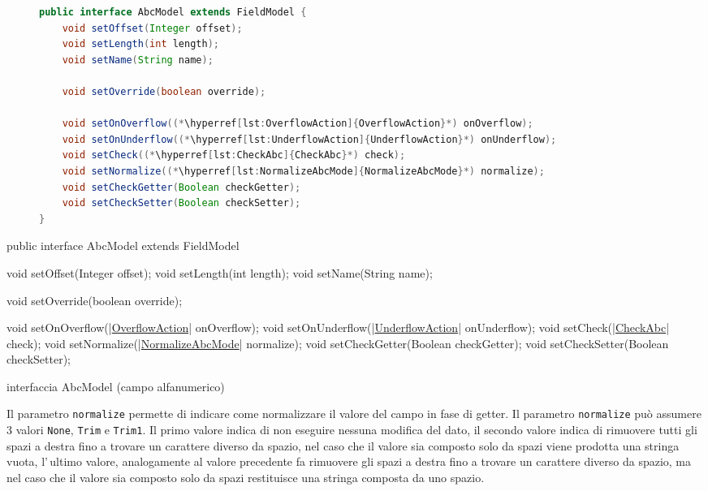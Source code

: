 \ifesource
\begin{figure*}[!htb]
\begin{lstlisting}[language=java, 
caption=interfaccia AbcModel (campo alfanumerico), 
label=lst:AbcModel]
public interface AbcModel extends FieldModel {
    void setOffset(Integer offset);
    void setLength(int length);
    void setName(String name);

    void setOverride(boolean override);

    void setOnOverflow((*\hyperref[lst:OverflowAction]{OverflowAction}*) onOverflow);
    void setOnUnderflow((*\hyperref[lst:UnderflowAction]{UnderflowAction}*) onUnderflow);
    void setCheck((*\hyperref[lst:CheckAbc]{CheckAbc}*) check);
    void setNormalize((*\hyperref[lst:NormalizeAbcMode]{NormalizeAbcMode}*) normalize);
    void setCheckGetter(Boolean checkGetter);
    void setCheckSetter(Boolean checkSetter);
}
\end{lstlisting}
\end{figure*}
\else
\begin{elisting}[!htb]
\begin{javacode}
public interface AbcModel extends FieldModel {
    void setOffset(Integer offset);
    void setLength(int length);
    void setName(String name);

    void setOverride(boolean override);

    void setOnOverflow(|\hyperref[lst:OverflowAction]{OverflowAction}| onOverflow);
    void setOnUnderflow(|\hyperref[lst:UnderflowAction]{UnderflowAction}| onUnderflow);
    void setCheck(|\hyperref[lst:CheckAbc]{CheckAbc}| check);
    void setNormalize(|\hyperref[lst:NormalizeAbcMode]{NormalizeAbcMode}| normalize);
    void setCheckGetter(Boolean checkGetter);
    void setCheckSetter(Boolean checkSetter);
}
\end{javacode}
\caption{interfaccia AbcModel (campo alfanumerico)}
\label{lst:AbcModel}
\end{elisting}
\fi

Il parametro \hypertarget{abc:nrm}{\texttt{normalize}} permette di indicare come 
normalizzare il valore del campo in fase di getter.
Il parametro \verb!normalize! può assumere 3 valori \verb!None!, \verb!Trim! e
\verb!Trim1!. Il primo valore indica di non eseguire nessuna modifica del dato,
il secondo valore indica di rimuovere tutti gli spazi a destra fino a trovare
un carattere diverso da spazio, nel caso che il valore sia composto solo da
spazi viene prodotta una stringa vuota, l'\,ultimo valore, analogamente al 
valore precedente fa rimuovere gli spazi a destra fino a trovare un carattere
diverso da spazio, ma nel caso che il valore sia composto solo da spazi 
restituisce una stringa composta da uno spazio.

